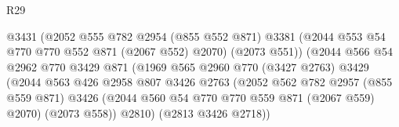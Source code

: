 \begin{lexlean}{R29}
\begin{coremodule}
                                          @3431
                                          (@2052
                                            @555
                                            @782
                                            @2954
                                            (@855 @552 @871)
                                            @3381
                                            (@2044 @553 @54 @770 @770 @552 @871 (@2067 @552) @2070)
                                            (@2073 @551))
                                          (@2044
                                            @566
                                            @54
                                            @2962
                                            @770
                                            @3429
                                            @871
                                            (@1969
                                              @565
                                              @2960
                                              @770
                                              (@3427 @2763)
                                              @3429
                                              (@2044
                                                @563
                                                @426
                                                @2958
                                                @807
                                                @3426
                                                @2763
                                                (@2052
                                                  @562
                                                  @782
                                                  @2957
                                                  (@855 @559 @871)
                                                  @3426
                                                  (@2044
                                                    @560
                                                    @54
                                                    @770
                                                    @770
                                                    @559
                                                    @871
                                                    (@2067 @559)
                                                    @2070)
                                                  (@2073 @558))
                                                @2810)
                                              (@2813 @3426 @2718))

\end{coremodule}
\end{lexlean}
